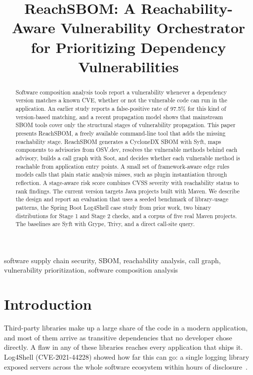 \documentclass[conference]{IEEEtran}
\begin{document}
\title{ReachSBOM: A Reachability-Aware Vulnerability Orchestrator for Prioritizing Dependency Vulnerabilities}

\author{
}

\maketitle

\begin{abstract}
Software composition analysis tools report a vulnerability whenever a dependency version matches a known CVE, whether or not the vulnerable code can run in the application. An earlier study reports a false-positive rate of 97.5\% for this kind of version-based matching, and a recent propagation model shows that mainstream SBOM tools cover only the structural stages of vulnerability propagation. This paper presents ReachSBOM, a freely available command-line tool that adds the missing reachability stage. ReachSBOM generates a CycloneDX SBOM with Syft, maps components to advisories from OSV.dev, resolves the vulnerable methods behind each advisory, builds a call graph with Soot, and decides whether each vulnerable method is reachable from application entry points. A small set of framework-aware edge rules models calls that plain static analysis misses, such as plugin instantiation through reflection. A stage-aware risk score combines CVSS severity with reachability status to rank findings. The current version targets Java projects built with Maven. We describe the design and report an evaluation that uses a seeded benchmark of library-usage patterns, the Spring Boot Log4Shell case study from prior work, two binary distributions for Stage 1 and Stage 2 checks, and a corpus of five real Maven projects. The baselines are Syft with Grype, Trivy, and a direct call-site query.
\end{abstract}

\begin{IEEEkeywords}
software supply chain security, SBOM, reachability analysis, call graph, vulnerability prioritization, software composition analysis
\end{IEEEkeywords}

\section{Introduction}
Third-party libraries make up a large share of the code in a modern application, and most of them arrive as transitive dependencies that no developer chose directly. A flaw in any of these libraries reaches every application that ships it. Log4Shell (CVE-2021-44228) showed how far this can go: a single logging library exposed servers across the whole software ecosystem within hours of disclosure~\cite{grgic}.
\end{document}
